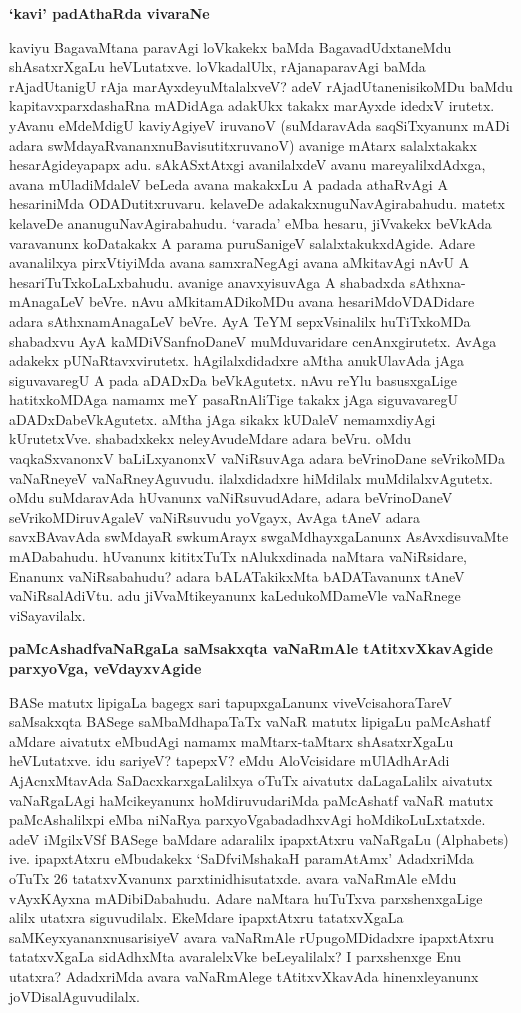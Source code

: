 \noindent
{\bf\large{`kavi' padAthaRda vivaraNe}}\label{page184}

kaviyu BagavaMtana paravAgi loVkakekx baMda BagavadUdxtaneMdu shAsatxrXgaLu heVLutatxve. loVkadalUlx, rAjanaparavAgi baMda rAjadUtanigU rAja marAyxdeyuMtalalxveV? adeV rAjadUtanenisikoMDu baMdu kapitavxparxdashaRna mADidAga adakUkx takakx marAyxde idedxV irutetx. yAvanu eMdeMdigU kaviyAgiyeV iruvanoV (suMdaravAda saqSiTxyanunx mADi adara swMdayaRvananxnuBavisutitxruvanoV) avanige mAtarx salalxtakakx hesarAgideyapapx adu. sAkASxtAtxgi avanilalxdeV avanu mareyalilxdAdxga, avana mUladiMdaleV beLeda avana makakxLu A padada athaRvAgi A hesariniMda ODADutitxruvaru. kelaveDe adakakxnuguNavAgirabahudu. matetx kelaveDe ananuguNavAgirabahudu. `varada' eMba hesaru, jiVvakekx beVkAda varavanunx koDatakakx A parama puruSanigeV salalxtakukxdAgide. Adare avanalilxya pirxVtiyiMda avana samxraNegAgi avana aMkitavAgi nAvU A hesariTuTxkoLaLxbahudu. avanige anavxyisuvAga A shabadxda sAthxna-mAnagaLeV beVre. nAvu aMkitamADikoMDu avana hesariMdoVDADidare adara sAthxnamAnagaLeV beVre. AyA TeYM sepxVsinalilx huTiTxkoMDa shabadxvu AyA kaMDiVSanfnoDaneV muMduvaridare cenAnxgirutetx. AvAga adakekx pUNaRtavxvirutetx. hAgilalxdidadxre aMtha anukUlavAda jAga siguvavaregU A pada aDADxDa beVkAgutetx. nAvu reYlu basusxgaLige hatitxkoMDAga namamx meY pasaRnAliTige takakx jAga siguvavaregU aDADxDabeVkAgutetx. aMtha jAga sikakx kUDaleV nemamxdiyAgi kUrutetxVve. shabadxkekx neleyAvudeMdare adara beVru. oMdu vaqkaSxvanonxV baLiLxyanonxV vaNiRsuvAga adara beVrinoDane seVrikoMDa vaNaRneyeV vaNaRneyAguvudu. ilalxdidadxre hiMdilalx muMdilalxvAgutetx. oMdu suMdaravAda hUvanunx vaNiRsuvudAdare, adara beVrinoDaneV seVrikoMDiruvAgaleV vaNiRsuvudu yoVgayx, AvAga tAneV adara savxBAvavAda swMdayaR swkumArayx swgaMdhayxgaLanunx AsAvxdisuvaMte mADabahudu. hUvanunx kititxTuTx nAlukxdinada naMtara vaNiRsidare, Enanunx vaNiRsabahudu? adara bALATakikxMta bADATavanunx tAneV vaNiRsalAdiVtu. adu jiVvaMtikeyanunx kaLedukoMDameVle vaNaRnege viSayavilalx.

\noindent
{\bf\large{paMcAshadfvaNaRgaLa saMsakxqta vaNaRmAle tAtitxvXkavAgide parxyoVga, veVdayxvAgide}}\label{page185}

BASe matutx lipigaLa bagegx sari tapupxgaLanunx viveVcisahoraTareV saMsakxqta BASege saMbaMdhapaTaTx vaNaR matutx lipigaLu paMcAshatf aMdare aivatutx eMbudAgi namamx maMtarx-taMtarx shAsatxrXgaLu heVLutatxve. idu sariyeV? tapepxV? eMdu AloVcisidare mUlAdhArAdi AjAcnxMtavAda SaDacxkarxgaLalilxya oTuTx aivatutx daLagaLalilx aivatutx vaNaRgaLAgi haMcikeyanunx hoMdiruvudariMda paMcAshatf vaNaR matutx paMcAshalilxpi eMba niNaRya parxyoVgabadadhxvAgi hoMdikoLuLxtatxde. adeV iMgilxVSf BASege baMdare adaralilx ipapxtAtxru vaNaRgaLu {\rm (Alphabets)} ive. ipapxtAtxru eMbudakekx `SaDfviMshakaH paramAtAmx' AdadxriMda oTuTx 26 tatatxvXvanunx parxtinidhisutatxde. avara vaNaRmAle eMdu vAyxKAyxna mADibiDabahudu. Adare naMtara huTuTxva parxshenxgaLige alilx utatxra siguvudilalx. EkeMdare ipapxtAtxru tatatxvXgaLa saMKeyxyananxnusarisiyeV avara vaNaRmAle rUpugoMDidadxre ipapxtAtxru tatatxvXgaLa sidAdhxMta avaralelxVke beLeyalilalx? I parxshenxge Enu utatxra? AdadxriMda avara vaNaRmAlege tAtitxvXkavAda hinenxleyanunx joVDisalAguvudilalx.

